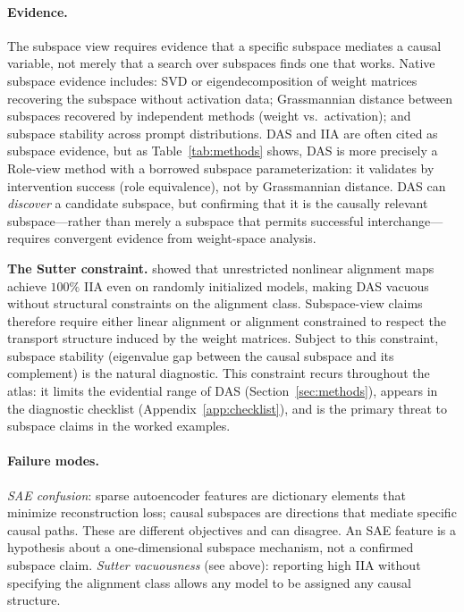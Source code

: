 \documentclass[11pt]{article}
\theoremstyle{remark}
\begin{document}
\paragraph{Evidence.}
The subspace view requires evidence that a specific subspace mediates a
causal variable, not merely that a search over subspaces finds one that
works.  Native subspace evidence includes: SVD or eigendecomposition of
weight matrices recovering the subspace without activation data;
Grassmannian distance between subspaces recovered by independent methods
(weight vs.\ activation); and subspace stability across prompt
distributions.  DAS and IIA are often cited as subspace evidence, but as
Table~\ref{tab:methods} shows, DAS is more precisely a Role-view method
with a borrowed subspace parameterization: it validates by intervention
success (role equivalence), not by Grassmannian distance.  DAS can
\emph{discover} a candidate subspace, but confirming that it is the
causally relevant subspace---rather than merely a subspace that permits
successful interchange---requires convergent evidence from weight-space
analysis.

\textbf{The Sutter constraint.}  \citet{sutter2025}\label{sutter}
showed that unrestricted nonlinear alignment maps achieve $100\%$ IIA
even on randomly initialized models, making DAS vacuous without
structural constraints on the alignment class.  Subspace-view claims
therefore require either linear alignment or alignment constrained to
respect the transport structure induced by the weight matrices.  Subject
to this constraint, subspace stability (eigenvalue gap between the causal
subspace and its complement) is the natural diagnostic.  This constraint
recurs throughout the atlas: it limits the evidential range of DAS
(Section~\ref{sec:methods}), appears in the diagnostic checklist
(Appendix~\ref{app:checklist}), and is the primary threat to subspace
claims in the worked examples.

\paragraph{Failure modes.}
\emph{SAE confusion}: sparse autoencoder features are dictionary elements
that minimize reconstruction loss; causal subspaces are directions that
mediate specific causal paths.  These are different objectives and can
disagree.  An SAE feature is a hypothesis about a one-dimensional
subspace mechanism, not a confirmed subspace claim.  \emph{Sutter vacuousness} (see above):
reporting high IIA without specifying the alignment class allows any
model to be assigned any causal structure.
\end{document}

